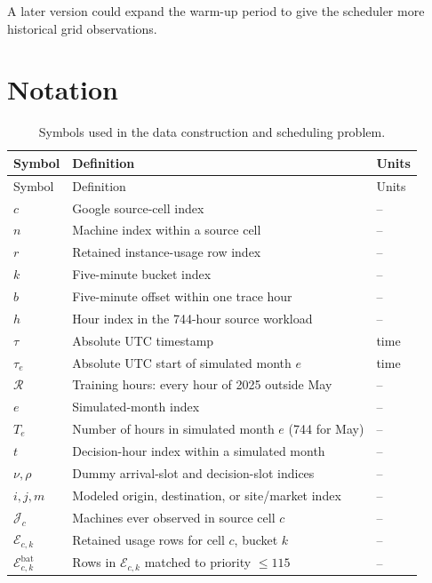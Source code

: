 \documentclass[conference]{IEEEtran}
\begin{document}
A later version could expand the warm-up period to give the scheduler more
historical grid observations.



\appendices
\onecolumn

\section{Notation}
\label{app:notation}

\begin{longtable}{@{}L{0.18\textwidth}L{0.56\textwidth}L{0.18\textwidth}@{}}
  \caption{Symbols used in the data construction and scheduling problem.}
  \label{tab:notation}\\
  \toprule
  Symbol & Definition & Units \\
  \midrule
  \endfirsthead
  \toprule
  Symbol & Definition & Units \\
  \midrule
  \endhead
  \(c\) & Google source-cell index & -- \\
  \(n\) & Machine index within a source cell & -- \\
  \(r\) & Retained instance-usage row index & -- \\
  \(k\) & Five-minute bucket index & -- \\
  \(b\) & Five-minute offset within one trace hour & -- \\
  \(h\) & Hour index in the 744-hour source workload & -- \\
  \(\tau\) & Absolute UTC timestamp & time \\
  \(\tau_e\) & Absolute UTC start of simulated month \(e\) & time \\
  \(\mathcal{R}\) & Training hours: every hour of 2025 outside May & -- \\
  \(e\) & Simulated-month index & -- \\
  \(T_e\) & Number of hours in simulated month \(e\) (744 for May) & -- \\
  \(t\) & Decision-hour index within a simulated month & -- \\
  \(\nu,\rho\) & Dummy arrival-slot and decision-slot indices & -- \\
  \(i,j,m\) & Modeled origin, destination, or site/market index & -- \\
  \(\mathcal J_c\) & Machines ever observed in source cell \(c\) & -- \\
  \(\mathcal E_{c,k}\) & Retained usage rows for cell \(c\), bucket \(k\) & -- \\
  \(\mathcal E^{\mathrm{bat}}_{c,k}\) & Rows in \(\mathcal E_{c,k}\) matched to priority \(\leq115\) & -- \\

\end{longtable}
\end{document}
